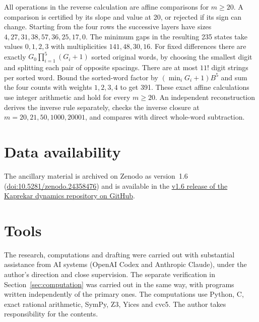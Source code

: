 \documentclass[11pt,reqno]{amsart}
\theoremstyle{remark}
\begin{document}
All operations in the reverse calculation are affine comparisons for \(m\ge20\). A comparison is certified by its slope and value at 20, or rejected if its sign can change. Starting from the four rows the successive layers have sizes \(4,27,31,38,57,36,25,17,0\). The minimum gaps in the resulting 235 states take values \(0,1,2,3\) with multiplicities \(141,48,30,16\). For fixed differences there are exactly \(G_0\prod_{i=1}^5(G_i+1)\) sorted original words, by choosing the smallest digit and splitting each pair of opposite spacings. There are at most \(11!\) digit strings per sorted word. Bound the sorted-word factor by \((\min_iG_i+1)B^5\) and sum the four counts with weights \(1,2,3,4\) to get 391. These exact affine calculations use integer arithmetic and hold for every \(m\ge20\). An independent reconstruction derives the inverse rule separately, checks the inverse closure at \(m=20,21,50,1000,20001\), and compares with direct whole-word subtraction.

\section*{Data availability}
The ancillary material is archived on Zenodo as version~1.6
(\href{https://doi.org/10.5281/zenodo.24358476}{doi:10.5281/zenodo.24358476}) and is available in the
\href{https://github.com/galyavin/kaprekar-dynamics/releases/tag/v1.6}{v1.6 release of the Kaprekar dynamics repository on GitHub}.

\section*{Tools}
The research, computations and drafting were carried out with substantial assistance from AI systems (OpenAI Codex and Anthropic Claude), under the author's direction and close supervision. The separate verification in Section~\ref{sec:computation} was carried out in the same way, with programs written independently of the primary ones. The computations use Python, C, exact rational arithmetic, SymPy, Z3, Yices and cvc5. The author takes responsibility for the contents.
\end{document}
